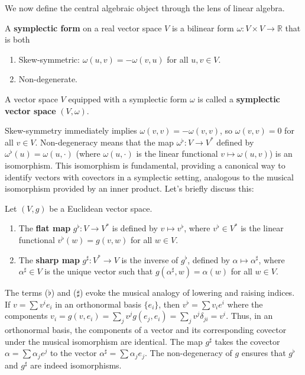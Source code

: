We now define the central algebraic object through the lens of linear algebra.

\begin{definition}
A \textbf{symplectic form} on a real vector space $V$ is a bilinear form $\omega: V \times V \to \mathbb{R}$ that is both
\begin{enumerate}
    \item Skew-symmetric: $\omega(u, v) = -\omega(v, u)$ for all $u, v \in V$.
    \item Non-degenerate.
\end{enumerate}

A vector space $V$ equipped with a symplectic form $\omega$ is called a \textbf{symplectic vector space} $(V, \omega)$. 
\end{definition}

Skew-symmetry immediately implies $\omega(v, v) = -\omega(v, v)$, so $\omega(v, v) = 0$ for all $v \in V$. Non-degeneracy means that the map $\omega^\flat: V \to V^*$ defined by $\omega^\flat(u) = \omega(u, \cdot)$ (where $\omega(u, \cdot)$ is the linear functional $v \mapsto \omega(u, v)$) is an isomorphism. This isomorphism is fundamental, providing a canonical way to identify vectors with covectors in a symplectic setting, analogous to the musical isomorphism provided by an inner product. Let's briefly discuss this:

\begin{definition} \label{def:musical_iso}
Let $(V, g)$ be a Euclidean vector space.
\begin{enumerate}
    \item The \textbf{flat map} $g^\flat: V \to V^*$ is defined by $v \mapsto v^\flat$, where $v^\flat \in V^*$ is the linear functional $v^\flat(w) = g(v, w)$ for all $w \in V$.
    \item The \textbf{sharp map} $g^\sharp: V^* \to V$ is the inverse of $g^\flat$, defined by $\alpha \mapsto \alpha^\sharp$, where $\alpha^\sharp \in V$ is the unique vector such that $g(\alpha^\sharp, w) = \alpha(w)$ for all $w \in V$.
\end{enumerate}
\end{definition}

The terms  ($\flat$) and  ($\sharp$) evoke the musical analogy of lowering and raising indices. If $v = \sum v^i e_i$ in an orthonormal basis $\{e_i\}$, then $v^\flat = \sum v_i e^i$ where the components $v_i = g(v, e_i) = \sum_j v^j g(e_j, e_i) = \sum_j v^j \delta_{ji} = v^i$. Thus, in an orthonormal basis, the components of a vector and its corresponding covector under the musical isomorphism are identical. The map $g^\sharp$ takes the covector $\alpha = \sum \alpha_j e^j$ to the vector $\alpha^\sharp = \sum \alpha_j e_j$. The non-degeneracy of $g$ ensures that $g^\flat$ and $g^\sharp$ are indeed isomorphisms.

